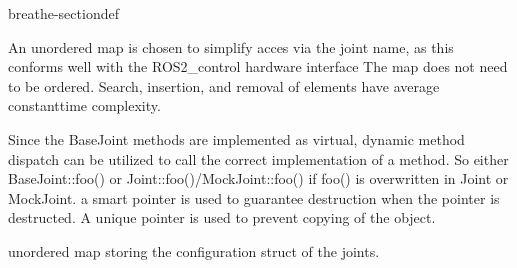 \documentclass[letterpaper,10pt,english]{sphinxmanual}
\begin{document}
\begin{fulllineitems}
\begin{sphinxuseclass}{breathe-sectiondef}
\begin{fulllineitems}
\sphinxAtStartPar
An unordered map is chosen to simplify acces via the joint name, as this conforms well with the ROS2\_control hardware interface The map does not need to be ordered. Search, insertion, and removal of elements have average constant\sphinxhyphen{}time complexity.

\sphinxAtStartPar
Since the BaseJoint methods are implemented as virtual, dynamic method dispatch can be utilized to call the correct implementation of a method. So either BaseJoint::foo() or Joint::foo()/MockJoint::foo() if foo() is overwritten in Joint or MockJoint. a smart pointer is used to guarantee destruction when the pointer is destructed. A unique pointer is used to prevent copying of the object. 

\end{fulllineitems}


\begin{fulllineitems}
\label{\detokenize{code/bioscara_hardware_interfaces/index:_CPPv4N28bioscara_hardware_interfaces28bioscara_hardware_interfaces28BioscaraArmHardwareInterface10_joint_cfgE}}\label{\detokenize{code/bioscara_hardware_interfaces/index:_CPPv3N28bioscara_hardware_interfaces28bioscara_hardware_interfaces28BioscaraArmHardwareInterface10_joint_cfgE}}\label{\detokenize{code/bioscara_hardware_interfaces/index:_CPPv2N28bioscara_hardware_interfaces28bioscara_hardware_interfaces28BioscaraArmHardwareInterface10_joint_cfgE}}\label{\detokenize{code/bioscara_hardware_interfaces/index:bioscara_hardware_interfaces::bioscara_hardware_interfaces::BioscaraArmHardwareInterface::_joint_cfg__std::unordered_map:ss.joint_config_t:}}
\pysigstartsignatures
\pysigstartmultiline
\pysigline
{\label{\detokenize{code/bioscara_hardware_interfaces/index:classbioscara__hardware__interfaces_1_1BioscaraArmHardwareInterface_1a24bfb6fef55ee2a8f659f82ab60b5a4b}}}
\pysigstopmultiline
\pysigstopsignatures
\sphinxAtStartPar
unordered map storing the configuration struct of the joints. 


\end{fulllineitems}
\end{sphinxuseclass}
\end{fulllineitems}
\end{document}
